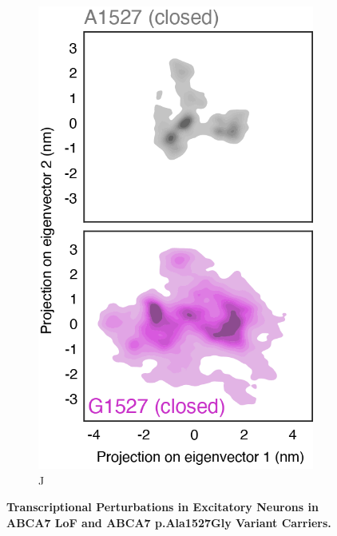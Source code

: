 \documentclass[12pt]{article}
\begin{document}
\begin{figure}[H]
\begin{subfigure}[t]{0.32\textwidth}
    \end{subfigure}
    \begin{subfigure}[t]{0.16\textwidth}
        \caption{J}
        \includegraphics[width=\textwidth]{./main_plots/variant_projection_closed.png}        
    \end{subfigure}
    \caption{
        \textbf{Transcriptional Perturbations in Excitatory Neurons in ABCA7 LoF and ABCA7 p.Ala1527Gly Variant Carriers.}\\
    }
    \label{fig:main_neurons}
\end{figure}
\end{document}
